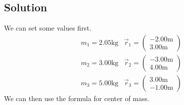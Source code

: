 \documentclass[12pt]{article}
\begin{document}
\subsection*{Solution}
We can set some values first.
\begin{align*}
    &m_1 = 2.05\unit{\kilo\gram}    &\vec{r}_1 = \left(\begin{smallmatrix}-2.00\unit{\meter}\\3.00\unit{\meter}\end{smallmatrix}\right)\\
    &m_2 = 3.00\unit{\kilo\gram}    &\vec{r}_2 = \left(\begin{smallmatrix}-3.00\unit{\meter}\\4.00\unit{\meter}\end{smallmatrix}\right)\\
    &m_3 = 5.00\unit{\kilo\gram}    &\vec{r}_3 = \left(\begin{smallmatrix}3.00\unit{\meter}\\-1.00\unit{\meter}\end{smallmatrix}\right)
\end{align*}
We can then use the formula for center of mass.
\end{document}
